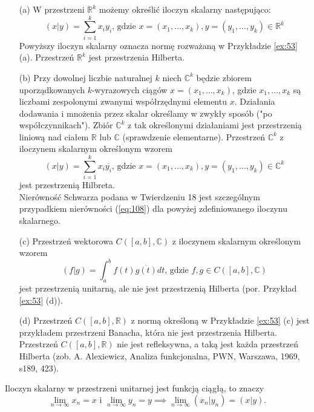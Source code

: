 \documentclass[leqno]{article}
\begin{document}
\begin{justify}
\begin{ex}
    \begin{enumerate}
        \item[(a)] W przestrzeni \(\mathbb{R}^k\) możemy określić iloczyn skalarny następująco:
        \[(x|y)=\sum_{i=1}^k x_i y_i\text{, gdzie } x=(x_1,\dots,x_k), y=(y_1,\dots,y_k)\in\mathbb{R}^k\]
        Powyższy iloczyn skalarny oznacza normę rozważaną w Przykładzie \ref{ex:53} (a). Przestrzeń \(\mathbb{R}^k\) jest przestrzenia Hilberta.
        \item[(b)] Przy dowolnej liczbie naturalnej \(k\) niech \(\mathbb{C}^k\) będzie zbiorem uporządkowanych \(k\)-wyrazowych ciągów \(x=(x_1,\dots,x_k)\), gdzie \(x_1,\dots,x_k\) są liczbami zespolonymi zwanymi współrzędnymi elementu \(x\). Działania dodawania i mnożenia przez skalar określamy w zwykły sposób ("po współczynnikach"). Zbiór \(\mathbb{C}^k\) z tak określonymi działaniami jest przestrzenią liniową nad ciałem \(\mathbb{R}\) lub \(\mathbb{C}\) (sprawdzenie elementarne). Przestrzeń \(\mathbb{C}^k\) z iloczynem skalarnym określonym wzorem
        \[(x|y)=\sum_{i=1}^k x_i \overline{y_i}\text{, gdzie } x=(x_1,\dots,x_k), y=(y_1,\dots,y_k)\in\mathbb{C}^k\]
        jest przestrzenią Hilbreta. \\
        Nierówność Schwarza podana w Twierdzeniu 18 jest szczególnym przypadkiem nierówności (\ref{eq:108}) dla powyżej zdefiniowanego iloczynu skalarnego.
        \item[(c)] Przestrzeń wektorowa \(C([a,b],\mathbb{C})\) z iloczynem skalarnym określonym wzorem
        \[(f|g)=\int_a^b f(t)\overline{g(t)}dt\text{, gdzie }f,g\in C([a,b],\mathbb{C})\]
        jest przestrzenią unitarną, ale nie jest przestrzenią Hilberta (por. Przykład \ref{ex:53} (d)).
        \item[(d)] Przestrzeń \(C([a,b],\mathbb{R})\) z normą określoną w Przykładzie \ref{ex:53} (c) jest przykładem przestrzeni Banacha, która nie jest przestrzenia Hilberta. Przestrzeń \(C([a,b],\mathbb{R})\) nie jest refleksywna, a taką jest każda przestrzeń Hilberta (zob. A. Alexiewicz, Analiza funkcjonalna, PWN, Warszawa, 1969, s189, 423).
    \end{enumerate}
\end{ex}

\begin{theorem}
{
    Iloczyn skalarny w przestrzeni unitarnej jest funkcją ciągłą, to znaczy
    \[
        \lim_{n\to\infty}x_n=x \text{ i } \lim_{n\to\infty}y_n=y \implies \lim_{n\to\infty}(x_n|y_n)=(x|y).
    \]
}
\end{theorem}


\end{justify}
\end{document}
